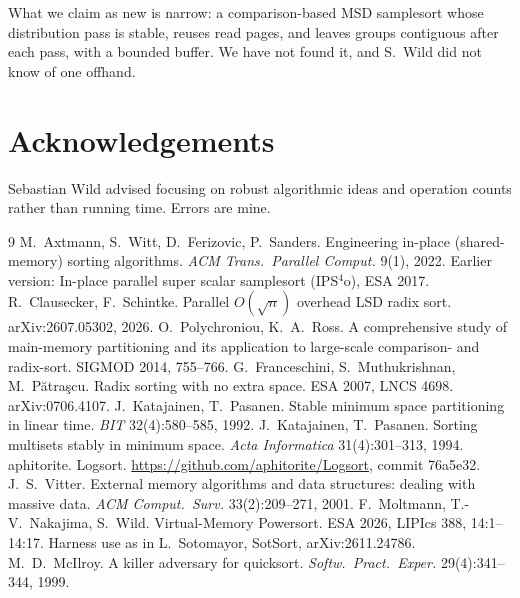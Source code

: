 \documentclass[11pt]{article}
\theoremstyle{remark}
\begin{document}
What we claim as new is narrow: a comparison-based MSD samplesort whose distribution
pass is stable, reuses read pages, and leaves groups contiguous after each pass, with a
bounded buffer. We have not found it, and S.~Wild did not know of one offhand.

\section*{Acknowledgements}
Sebastian Wild advised focusing on robust algorithmic ideas and operation counts rather
than running time. Errors are mine.

\begin{thebibliography}{9}
 M.~Axtmann, S.~Witt, D.~Ferizovic, P.~Sanders. Engineering in-place
(shared-memory) sorting algorithms. \emph{ACM Trans.\ Parallel Comput.} 9(1), 2022.
Earlier version: In-place parallel super scalar samplesort (IPS$^4$o), ESA 2017.
 R.~Clausecker, F.~Schintke. Parallel $O(\sqrt n)$ overhead LSD radix sort.
arXiv:2607.05302, 2026.
 O.~Polychroniou, K.~A.~Ross. A comprehensive study of main-memory partitioning
and its application to large-scale comparison- and radix-sort. SIGMOD 2014, 755--766.
 G.~Franceschini, S.~Muthukrishnan, M.~P\u{a}tra\c{s}cu. Radix sorting with no
extra space. ESA 2007, LNCS 4698. arXiv:0706.4107.
 J.~Katajainen, T.~Pasanen. Stable minimum space partitioning in linear time.
\emph{BIT} 32(4):580--585, 1992.
 J.~Katajainen, T.~Pasanen. Sorting multisets stably in minimum space.
\emph{Acta Informatica} 31(4):301--313, 1994.
 aphitorite. Logsort. \url{https://github.com/aphitorite/Logsort}, commit 76a5e32.
 J.~S.~Vitter. External memory algorithms and data structures: dealing with
massive data. \emph{ACM Comput.\ Surv.} 33(2):209--271, 2001.
 F.~Moltmann, T.-V.~Nakajima, S.~Wild. Virtual-Memory Powersort. ESA 2026,
LIPIcs 388, 14:1--14:17. Harness use as in L.~Sotomayor, SotSort, arXiv:2611.24786.
 M.~D.~McIlroy. A killer adversary for quicksort. \emph{Softw.\ Pract.\ Exper.}
29(4):341--344, 1999.
\end{thebibliography}
\end{document}
